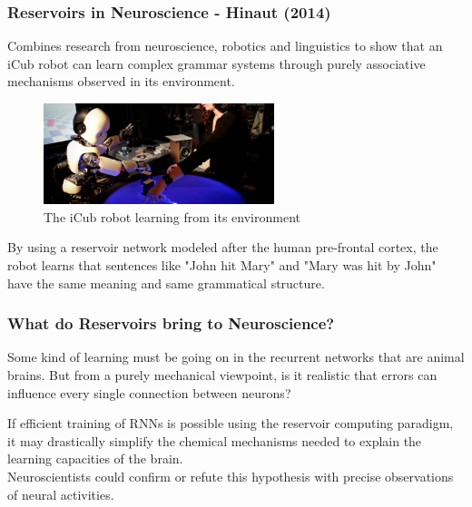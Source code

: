 \documentclass{beamer}
\begin{document}
\begin{frame}
\frametitle{Reservoirs in Neuroscience - Hinaut (2014)}
Combines research from neuroscience, robotics and linguistics to show that an iCub robot can learn complex grammar systems through purely associative mechanisms observed in its environment.
\begin{figure}[!htbp]
\centering
\includegraphics[width=0.6\textwidth]{pictures/icub.png}
\caption{The iCub robot learning from its environment}
\label{fig:icub}
\end{figure}
\vspace{-7mm}
By using a reservoir network modeled after the human pre-frontal cortex, the robot learns that sentences like "John hit Mary" and "Mary was hit by John" have the same meaning and same grammatical structure.


\end{frame}

\begin{frame}
\frametitle{What do Reservoirs bring to Neuroscience?}
\begin{center}
Some kind of learning must be going on in the recurrent networks that are animal brains. But from a purely mechanical viewpoint, is it realistic that errors can influence every single connection between neurons?
\end{center}

If efficient training of RNNs is possible using the reservoir computing paradigm, it may drastically simplify the chemical mechanisms needed to explain the learning capacities of the brain.\\
Neuroscientists could confirm or refute this hypothesis with precise observations of neural activities.

\end{frame}

\end{document}
